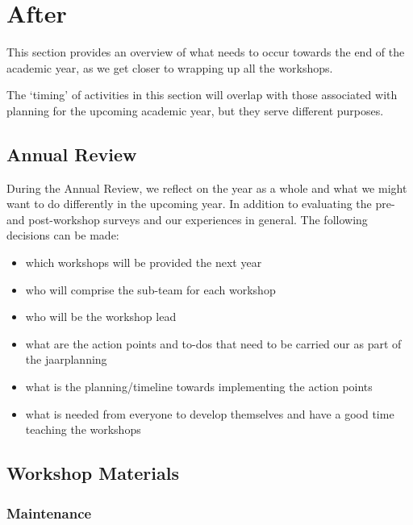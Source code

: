 \documentclass[
  letterpaper,
  DIV=11,
  numbers=noendperiod]{scrreprt}
\providecommand{\tightlist}{%
  \setlength{\itemsep}{0pt}\setlength{\parskip}{0pt}}\usepackage{longtable,booktabs,array}
\begin{document}
\chapter*{After}\label{after}


This section provides an overview of what needs to occur towards the end
of the academic year, as we get closer to wrapping up all the workshops.

The `timing' of activities in this section will overlap with those
associated with planning for the upcoming academic year, but they serve
different purposes.

\section*{Annual Review}\label{annual-review}


During the Annual Review, we reflect on the year as a whole and what we
might want to do differently in the upcoming year. In addition to
evaluating the pre- and post-workshop surveys and our experiences in
general. The following decisions can be made:

\begin{itemize}
\tightlist
\item
  which workshops will be provided the next year
\item
  who will comprise the sub-team for each workshop
\item
  who will be the workshop lead
\item
  what are the action points and to-dos that need to be carried our as
  part of the jaarplanning
\item
  what is the planning/timeline towards implementing the action points
\item
  what is needed from everyone to develop themselves and have a good
  time teaching the workshops
\end{itemize}

\section*{Workshop Materials}\label{workshop-materials}


\subsection*{Maintenance}\label{maintenance}
\end{document}
